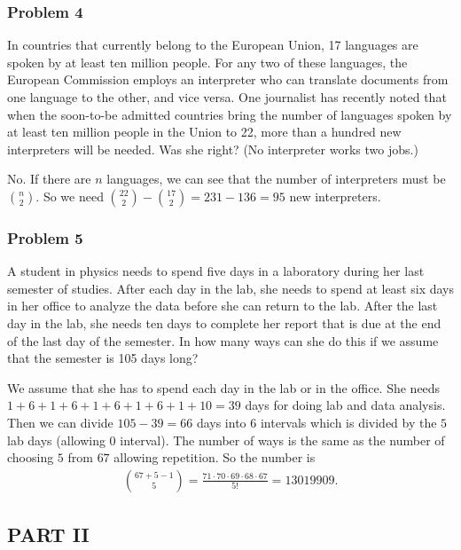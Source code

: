\documentclass[12pt]{article}
\begin{document}
\subsubsection*{Problem 4}
In countries that currently belong to the European Union, 17 languages are spoken by at least ten million people. For any two of these languages, the European Commission employs an interpreter who can translate documents from one language to the other, and vice versa. One journalist has recently noted that when the soon-to-be admitted countries bring the number of languages spoken by at least ten million people in the Union to 22, more than a hundred new interpreters will be needed. Was she right? (No interpreter works two jobs.)
\begin{solution}
No. If there are $n$ languages, we can see that the number of interpreters must be ${n \choose 2}$. So we need ${22 \choose 2} - {17 \choose 2} = 231 - 136 = 95$ new interpreters.
\end{solution}
\vspace{-50pt}

\subsubsection*{Problem 5}
A student in physics needs to spend five days in a laboratory during her last semester of studies. After each day in the lab, she needs to spend at least six days in her office to analyze the data before she can return to the lab. After the last day in the lab, she needs ten days to complete her report that is due at the end of the last day of the semester. In how many ways can she do this if we assume that the semester is 105 days long?
\begin{solution}
We assume that she has to spend each day in the lab or in the office. She needs $1 + 6 + 1 + 6 + 1 + 6 + 1 + 6 + 1 + 10 = 39$ days for doing lab and data analysis. Then we can divide $105 - 39 = 66$ days into $6$ intervals which is divided by the $5$ lab days (allowing $0$ interval). The number of ways is the same as the number of choosing $5$ from $67$ allowing repetition. So the number is
\begin{align*}
    {67+5-1 \choose 5} = \frac{71 \cdot 70 \cdot 69 \cdot 68 \cdot 67}{5!} = 13019909.
\end{align*}
\end{solution}
\subsection*{PART II}
\end{document}

